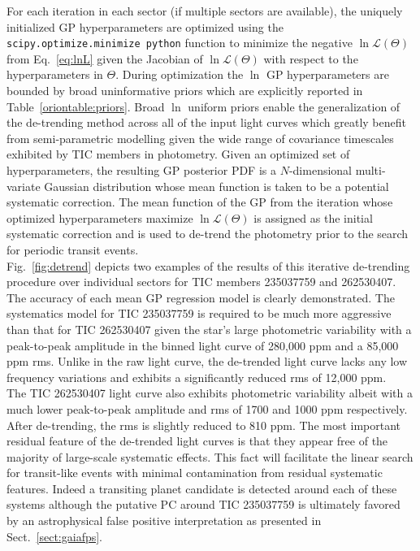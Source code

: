 For each iteration in each \tess{} sector (if multiple sectors are available),
the uniquely initialized GP hyperparameters are optimized
using the \texttt{scipy.optimize.minimize python} function to minimize the negative
$\ln{\mathcal{L}(\Theta)}$ from Eq.~\ref{eq:lnL}
given the Jacobian of $\ln{\mathcal{L}(\Theta)}$ with respect to the hyperparameters in
$\Theta$. During optimization the $\ln$ GP hyperparameters are bounded by broad uninformative priors
which are explicitly reported in Table~\ref{oriontable:priors}. Broad $\ln$ uniform priors enable
the generalization of the \pipeline{} de-trending method across all of the input \tess{} light curves
which greatly benefit from semi-parametric modelling given the wide range of covariance timescales
exhibited by TIC members in photometry.
Given an optimized set of hyperparameters, the resulting GP posterior PDF is a $N$-dimensional
multi-variate Gaussian distribution whose mean function is taken to be a potential systematic correction.
The mean function of the GP from the iteration whose optimized hyperparameters maximize
$\ln{\mathcal{L}(\Theta)}$ is assigned as the initial systematic
correction and is used to de-trend the photometry prior to the search for periodic transit events. \\



Fig.~\ref{fig:detrend} depicts two examples of the results of this iterative de-trending procedure over
individual \tess{} sectors for TIC members 235037759 and 262530407. The accuracy of each mean GP regression model
is clearly demonstrated. The systematics model for TIC 235037759
is required to be much more aggressive than that for TIC 262530407
given the star's large photometric variability with a peak-to-peak
amplitude in the binned light curve of 280,000 ppm and a 85,000 ppm rms. Unlike in the raw
light curve, the de-trended light curve lacks any low frequency variations and exhibits a significantly
reduced rms of 12,000 ppm. \\

The TIC 262530407 light curve also exhibits photometric variability albeit with a much lower peak-to-peak
amplitude and rms of 1700 and 1000 ppm respectively. After de-trending, the rms is slightly reduced to 
810 ppm. The most important residual feature of the de-trended light curves is that they appear free
of the majority of large-scale systematic effects. This fact will facilitate the linear search for
transit-like events with minimal contamination from residual systematic features. Indeed 
a transiting planet candidate is detected
around each of these systems although the putative PC around TIC 235037759
is ultimately favored by an astrophysical false positive interpretation as presented in
Sect.~\ref{sect:gaiafps}. \\

